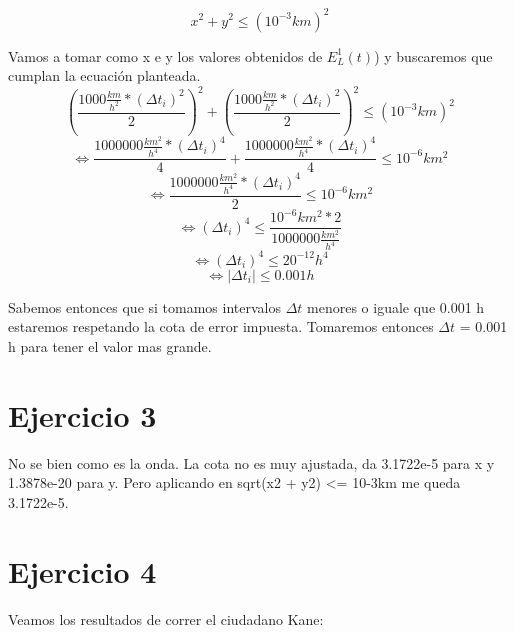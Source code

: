 \documentclass[a4paper,10pt]{article}
\begin{document}
\begin{equation}
	x^2 + y^2 \leq (10^{-3} km)^2
\end{equation}
\par Vamos a tomar como x e y los valores obtenidos de $E_L^1(t)$) y buscaremos que cumplan la ecuación planteada.
\begin{equation}
	(\frac{1000 \frac{km}{h^2} * (\Delta t_i)^2}{2})^2 + (\frac{1000 \frac{km}{h^2} * (\Delta t_i)^2}{2})^2 \leq (10^{-3} km)^2
\end{equation}
\begin{equation}
	\Leftrightarrow \frac{1000000 \frac{km^2}{h^4} * (\Delta t_i)^4}{4} + \frac{1000000 \frac{km^2}{h^4} * (\Delta t_i)^4}{4} \leq 10^{-6} km^2
\end{equation}
\begin{equation}
	\Leftrightarrow \frac{1000000 \frac{km^2}{h^4} * (\Delta t_i)^4}{2} \leq 10^{-6} km^2
\end{equation}
\begin{equation}
	\Leftrightarrow (\Delta t_i)^4 \leq \frac{10^{-6} km^2 * 2}{1000000 \frac{km^2}{h^4}}
\end{equation}
\begin{equation}
	\Leftrightarrow (\Delta t_i)^4 \leq 20^{-12} h^4
\end{equation}
\begin{equation}
	\Leftrightarrow | \Delta t_i | \leq 0.001 h
\end{equation}
\par Sabemos entonces que si tomamos intervalos $\Delta t$ menores o iguale que 0.001 h estaremos respetando la cota de error impuesta. Tomaremos entonces $\Delta t$ = 0.001 h para tener el valor mas grande.



\section{Ejercicio 3}
No se bien como es la onda. La cota no es muy ajustada, da 3.1722e-5 para x y 1.3878e-20 para y. Pero aplicando en sqrt(x2 + y2) <= 10-3km me queda 3.1722e-5.


\section{Ejercicio 4}
\par Veamos los resultados de correr el ciudadano Kane:
\end{document}
